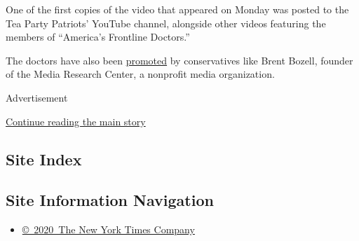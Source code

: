 One of the first copies of the video that appeared on Monday was posted
to the Tea Party Patriots' YouTube channel, alongside other videos
featuring the members of ``America's Frontline Doctors.''

The doctors have also been
\href{https://web.archive.org/web/20200728210031/https://twitter.com/daveyalba/status/1287933609433804802}{promoted}
by conservatives like Brent Bozell, founder of the Media Research
Center, a nonprofit media organization.

Advertisement

\protect\hyperlink{after-bottom}{Continue reading the main story}

\hypertarget{site-index}{%
\subsection{Site Index}\label{site-index}}

\hypertarget{site-information-navigation}{%
\subsection{Site Information
Navigation}\label{site-information-navigation}}

\begin{itemize}
\tightlist
\item
  \href{https://web.archive.org/web/20200728210031/https://help.nytimes.com/hc/en-us/articles/115014792127-Copyright-notice}{©~2020~The
  New York Times Company}
\end{itemize}

